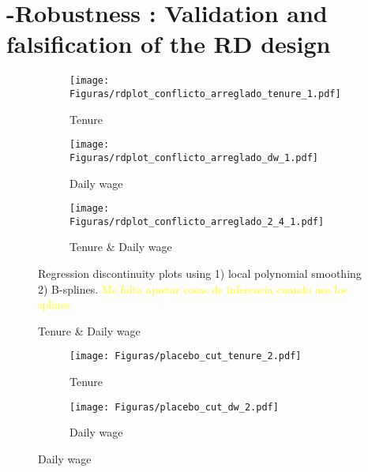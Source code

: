 
\section{ -Robustness : Validation and falsification of the RD design}
\vspace{.2in}


\begin{figure}[H]
     \caption{RD plots (Control)}
    \label{rd_t1}
\begin{center}
\begin{subfigure}{0.31\textwidth}

\caption{Tenure}
        \texttt{[image: Figuras/rdplot\_conflicto\_arreglado\_tenure\_1.pdf]}
    \end{subfigure}
    \begin{subfigure}{0.31\textwidth}
\caption{Daily wage}
        \texttt{[image: Figuras/rdplot\_conflicto\_arreglado\_dw\_1.pdf]}
    \end{subfigure}        
    \begin{subfigure}{0.31\textwidth}
\caption{Tenure \& Daily wage}
        \texttt{[image: Figuras/rdplot\_conflicto\_arreglado\_2\_4\_1.pdf]}
    \end{subfigure}
  \end{center}
  
    \scriptsize Regression discontinuity plots using 1) local polynomial smoothing 2) B-splines. \textcolor{yellow}{Me falta ajustar cosas de inferencia cuando uso los splines.}
\end{figure}




\begin{figure}[H]
     \caption{Estimation for artificial cutoffs (Calculator treatment)}
    \label{placebo_cutoff_t2}
\begin{center}
\begin{subfigure}{0.475\textwidth}
\caption{Tenure}
        \texttt{[image: Figuras/placebo\_cut\_tenure\_2.pdf]}
    \end{subfigure}
    \begin{subfigure}{0.475\textwidth}
\caption{Daily wage}
        \texttt{[image: Figuras/placebo\_cut\_dw\_2.pdf]}
    \end{subfigure}
  \end{center}
  
    \scriptsize 
\end{figure}


